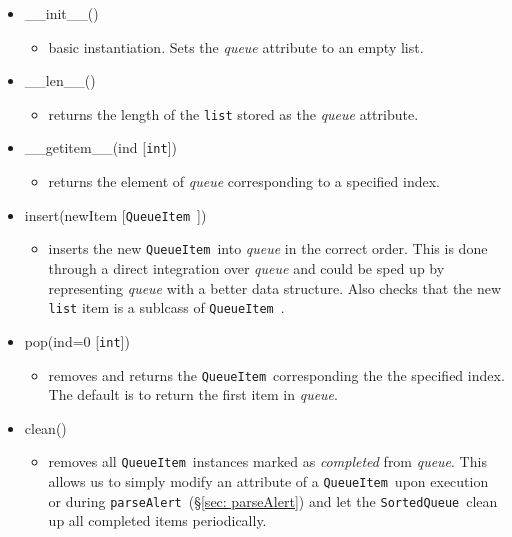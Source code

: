 \documentclass{article}
\newcommand{\parseAlert}{\texttt{parseAlert}~}
\newcommand{\SortedQueue}{\texttt{SortedQueue}~}
\newcommand{\QueueItem}{\texttt{QueueItem}~}
\begin{document}
\begin{itemize}
    \item{\_\_init\_\_()
        \begin{itemize}
            \item{basic instantiation. Sets the \textit{queue} attribute to an empty list.}
        \end{itemize}
         }
    \item{\_\_len\_\_()
        \begin{itemize}
            \item{returns the length of the \texttt{list} stored as the \textit{queue} attribute.}
        \end{itemize}
         }
    \item{\_\_getitem\_\_(ind [\texttt{int}])
        \begin{itemize}
            \item{returns the element of \textit{queue} corresponding to a specified index.}
        \end{itemize}
         }
    \item{insert(newItem [\QueueItem])
        \begin{itemize}
            \item{inserts the new \QueueItem into \textit{queue} in the correct order. This is done through a direct integration over \textit{queue} and could be sped up by representing \textit{queue} with a better data structure. Also checks that the new \texttt{list} item is a sublcass of \QueueItem.}
        \end{itemize}
         }
    \item{pop(ind=0 [\texttt{int}])
        \begin{itemize}
            \item{removes and returns the \QueueItem corresponding the the specified index. The default is to return the first item in \textit{queue}.}
        \end{itemize}
         }
    \item{clean()
        \begin{itemize}
            \item{removes all \QueueItem instances marked as \textit{completed} from \textit{queue}. This allows us to simply modify an attribute of a \QueueItem upon execution or during \parseAlert (\S\ref{sec: parseAlert}) and let the \SortedQueue clean up all completed items periodically.}
        \end{itemize}
         }
\end{itemize}
\end{document}
